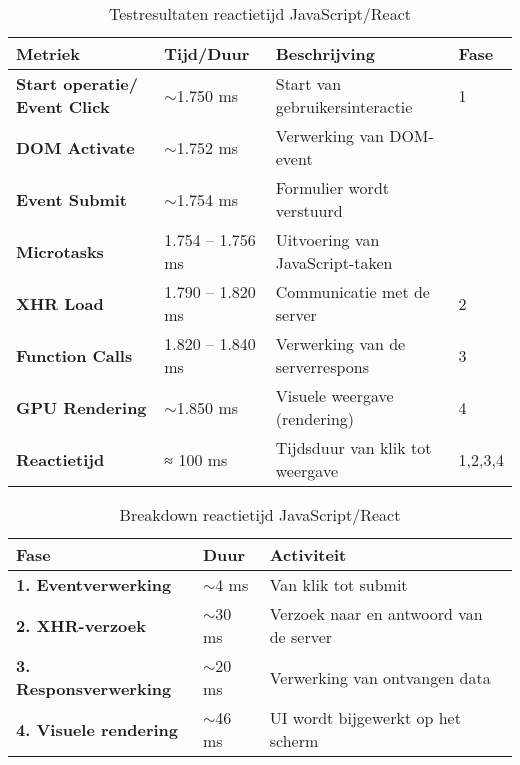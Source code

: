 \begin{table}[H]
    \centering
    \begin{tabular}{ |p{4cm}|p{3cm}|p{6cm}|p{1cm}|}
        \hline
        \textbf{Metriek} & \textbf{Tijd/Duur} & \textbf{Beschrijving} & \textbf{Fase}\\
        \hline
        \textbf{Start operatie/ Event Click}  & $\sim$1.750 ms & Start van gebruikersinteractie & 1\\
        \cline{1-3}
        \textbf{\gls{DOM} Activate} & $\sim$1.752 ms & Verwerking van DOM-event &  \\
        \cline{1-3}
        \textbf{Event Submit}  & $\sim$1.754 ms & Formulier wordt verstuurd &  \\
        \cline{1-3}
        \textbf{Microtasks}  & 1.754 – 1.756 ms & Uitvoering van JavaScript-taken &  \\
        \hline                       
        \textbf{\gls{XHR} Load}  & 1.790 – 1.820 ms & Communicatie met de server & 2 \\
        \hline
        \textbf{Function Calls}  & 1.820 – 1.840 ms & Verwerking van de serverrespons & 3 \\
        \hline
        \textbf{GPU Rendering}  & $\sim$1.850 ms & 	Visuele weergave (rendering) & 4 \\
        \hline
        \textbf{Reactietijd}  & ≈ 100 ms & 	Tijdsduur van klik tot weergave & 1,2,3,4 \\
        \hline
    \end{tabular}
    \caption[\centering Testresultaten reactietijd JavaScript/React]{\label{tab:Testresultaten JS reactietijd}Testresultaten reactietijd JavaScript/React}
\end{table}

\begin{table}[H]
    \centering
    \begin{tabular}{ |p{}|p{3cm}|p{6cm}|}
        \hline
        \textbf{Fase} & \textbf{Duur} & \textbf{Activiteit}\\
        \hline
        \textbf{1. Eventverwerking}  & $\sim$4 ms & Van klik tot submit \\
        \hline
        \textbf{2. \gls{XHR}-verzoek} & $\sim$30 ms & Verzoek naar en antwoord van de server \\
        \hline
        \textbf{3. Responsverwerking}  & $\sim$20 ms & Verwerking van ontvangen data \\
        \hline
        \textbf{4. Visuele rendering}  & $\sim$46 ms & \gls{UI} wordt bijgewerkt op het scherm \\
        \hline                       

    \end{tabular}
    \caption[\centering Breakdown reactietijd JavaScript/React]{\label{tab:breakdown JS reactietijd}Breakdown reactietijd JavaScript/React}
\end{table}




